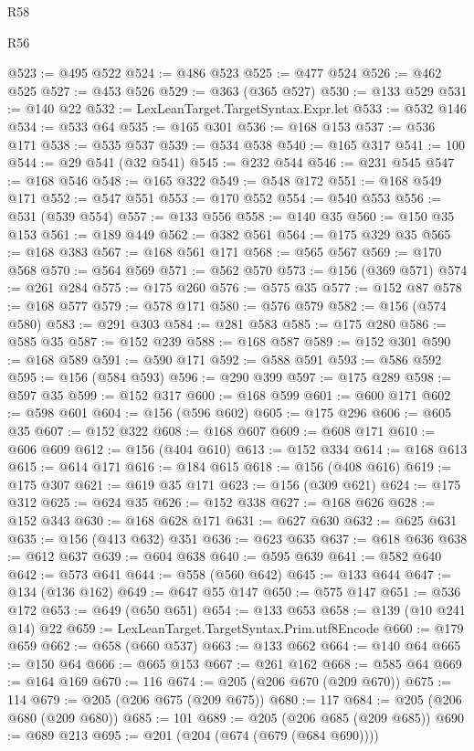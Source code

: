 \begin{lexlean}{R58}
\begin{lexlean}{R56}
\begin{coremodule}
{{{{{{{{{{{{{{{{{{{{{{{{{{{{{{{{{{{{{{{{{{{{{{{{{{{{{{{{{{{{{{{{{{{{{{{{{{{{{{{{{{{{{{{{{{{{{{{{{{{{{{{{{{{{{{{{{{{{{{{{{{{{{{{{{{{{{{{{{{{{{{{{{{{{{{{{{{{{{{{{{{{{{{{{{{{{{{{{{{{{{{{{{{{{{{{{{{{{{{{{{{{{{{{{{{{@523 := @495 @522
@524 := @486 @523
@525 := @477 @524
@526 := @462 @525
@527 := @453 @526
@529 := @363 (@365 @527)
@530 := @133 @529
@531 := @140 @22
@532 := LexLeanTarget.TargetSyntax.Expr.let
@533 := @532 @146
@534 := @533 @64
@535 := @165 @301
@536 := @168 @153
@537 := @536 @171
@538 := @535 @537
@539 := @534 @538
@540 := @165 @317
@541 := 100
@544 := @29 @541 (@32 @541)
@545 := @232 @544
@546 := @231 @545
@547 := @168 @546
@548 := @165 @322
@549 := @548 @172
@551 := @168 @549 @171
@552 := @547 @551
@553 := @170 @552
@554 := @540 @553
@556 := @531 (@539 @554)
@557 := @133 @556
@558 := @140 @35
@560 := @150 @35 @153
@561 := @189 @449
@562 := @382 @561
@564 := @175 @329 @35
@565 := @168 @383
@567 := @168 @561 @171
@568 := @565 @567
@569 := @170 @568
@570 := @564 @569
@571 := @562 @570
@573 := @156 (@369 @571)
@574 := @261 @284
@575 := @175 @260
@576 := @575 @35
@577 := @152 @87
@578 := @168 @577
@579 := @578 @171
@580 := @576 @579
@582 := @156 (@574 @580)
@583 := @291 @303
@584 := @281 @583
@585 := @175 @280
@586 := @585 @35
@587 := @152 @239
@588 := @168 @587
@589 := @152 @301
@590 := @168 @589
@591 := @590 @171
@592 := @588 @591
@593 := @586 @592
@595 := @156 (@584 @593)
@596 := @290 @399
@597 := @175 @289
@598 := @597 @35
@599 := @152 @317
@600 := @168 @599
@601 := @600 @171
@602 := @598 @601
@604 := @156 (@596 @602)
@605 := @175 @296
@606 := @605 @35
@607 := @152 @322
@608 := @168 @607
@609 := @608 @171
@610 := @606 @609
@612 := @156 (@404 @610)
@613 := @152 @334
@614 := @168 @613
@615 := @614 @171
@616 := @184 @615
@618 := @156 (@408 @616)
@619 := @175 @307
@621 := @619 @35 @171
@623 := @156 (@309 @621)
@624 := @175 @312
@625 := @624 @35
@626 := @152 @338
@627 := @168 @626
@628 := @152 @343
@630 := @168 @628 @171
@631 := @627 @630
@632 := @625 @631
@635 := @156 (@413 @632) @351
@636 := @623 @635
@637 := @618 @636
@638 := @612 @637
@639 := @604 @638
@640 := @595 @639
@641 := @582 @640
@642 := @573 @641
@644 := @558 (@560 @642)
@645 := @133 @644
@647 := @134 (@136 @162)
@649 := @647 @55 @147
@650 := @575 @147
@651 := @536 @172
@653 := @649 (@650 @651)
@654 := @133 @653
@658 := @139 (@10 @241 @14) @22
@659 := LexLeanTarget.TargetSyntax.Prim.utf8Encode
@660 := @179 @659
@662 := @658 (@660 @537)
@663 := @133 @662
@664 := @140 @64
@665 := @150 @64
@666 := @665 @153
@667 := @261 @162
@668 := @585 @64
@669 := @164 @169
@670 := 116
@674 := @205 (@206 @670 (@209 @670))
@675 := 114
@679 := @205 (@206 @675 (@209 @675))
@680 := 117
@684 := @205 (@206 @680 (@209 @680))
@685 := 101
@689 := @205 (@206 @685 (@209 @685))
@690 := @689 @213
@695 := @201 (@204 (@674 (@679 (@684 @690))))
}}}}}}}}}}}}}}}}}}}}}}}}}}}}}}}}}}}}}}}}}}}}}}}}}}}}}}}}}}}}}}}}}}}}}}}}}}}}}}}}}}}}}}}}}}}}}}}}}}}}}}}}}}}}}}}}}}}}}}}}}}}}}}}}}}}}}}}}}}}}}}}}}}}}}}}}}}}}}}}}}}}}}}}}}}}}}}}}}}}}}}}}}}}}}}}}}}}}}}}}}}}}}}}}}}}
\end{coremodule}
\end{lexlean}
\end{lexlean}
